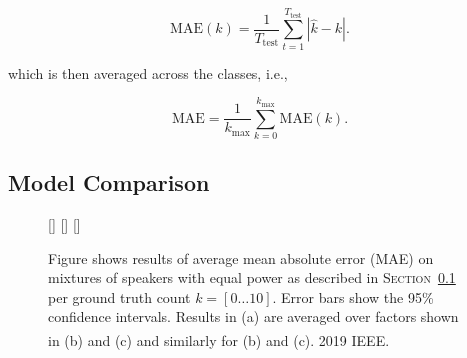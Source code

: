 \begin{equation}
  \mbox{MAE}(k) = \frac{1}{T_{\textrm{test}}} \sum_{t=1}^{T_\textrm{test}}\left| \hat{k} - k \right|.
\end{equation}

which is then averaged across the classes, i.e.,

\begin{equation}
  \mbox{MAE} = \frac{1}{k_{\max}} \sum_{k=0}^{k_{\max}} \mbox{MAE}(k).
\end{equation}


\subsection{Model Comparison}%
\label{ssec:model_comparsion}

\begin{figure}
\centering
{}
[\textwidth]{}%
\hspace{0.2\textwidth} %
[\textwidth]{}%
\hspace{0.2\textwidth} %
[\textwidth]{}%
\caption[Short Caption]{Figure shows results of average mean absolute error (MAE) on mixtures of speakers with equal power as described in \textsc{Section~\ref{ssec:model_comparsion}} per ground truth count \(k=[0\ldots10]\). Error bars show the 95\% confidence intervals. Results in (a) are averaged over factors shown in (b) and (c) and similarly for (b) and (c). \textsuperscript{\textregistered} 2019 IEEE.}
\label{fig:fixed-gain-results}
\end{figure}

